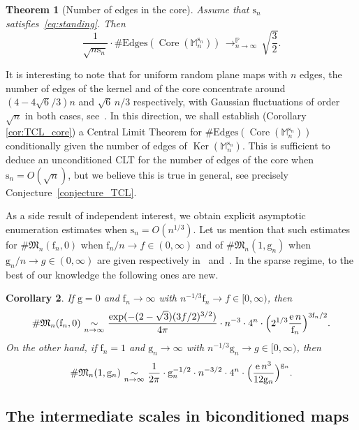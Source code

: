 \documentclass[JEP,XML,SOM,Unicode,NoFloatCountersInSection,NoEqCountersInSection]{cedram}
\theoremstyle{plain}
\newtheorem{theorem}{Theorem}
\newtheorem{corollary}[theorem]{Corollary}
\theoremstyle{definition}
\theoremstyle{remark}
\renewcommand{\P}{\mathbb{P}}
\newcommand{\e}{\operatorname{e}}
\newcommand{\Mapb}{\mathbb{M}}
\newcommand{\face}{\mathrm{f}}
\newcommand{\gen}{\mathrm{g}}
\newcommand{\spar}{\mathrm{s}}
\DeclareMathOperator{\Core}{Core}
\DeclareMathOperator{\Ker}{Ker}
\newcommand{\cvproba}[1][n]{\,\mathop{\longrightarrow}^{\P}_{#1 \to \infty}\,}
\newcommand{\equi}[1][n]{\,\mathop{\sim}^{}_{#1 \to \infty}\,}
\begin{document}
\begin{theorem}[Number of edges in the core]
\label{thm:aretes_core}
Assume that $\spar_n$ satisfies~\eqref{eq:standing}.
Then
\[
\frac{1}{\sqrt{n\spar_n}} \cdot \#\mathrm{Edges}(\Core(\Mapb_n^{\spar_{n}})) \cvproba \sqrt{\frac{3}{2}}.
\]
\end{theorem}

It is interesting to note that for uniform random plane maps with $n$ edges, the number of edges of the kernel and of the core concentrate around $(4-4 \sqrt{6}/3)n$ and $\sqrt{6}\,n/3$ respectively, with Gaussian fluctuations of order $\sqrt{n}$ in both cases, see~\cite[Th.\,5]{NR18}. In this direction, we shall establish (Corollary \ref{cor:TCL_core}) a Central Limit Theorem for $\#\mathrm{Edges}(\Core(\Mapb_n^{\spar_{n}}))$ conditionally given the number of edges of $\Ker(\Mapb_n^{\spar_{n}})$.
This is sufficient to deduce an unconditioned CLT for the number of edges of the core when $\spar_n = O(\sqrt{n})$, but we believe this is true in general, see precisely Conjecture~\ref{conjecture_TCL}.

As a side result of independent interest, we obtain explicit asymptotic enumeration estimates when $\spar_n= O(n^{1/3})$. Let us mention that such estimates for $\# \mathfrak{M}_{n}(\face_{n},0)$ when $\face_{n}/n \rightarrow f \in (0,\infty)$ and of $\# \mathfrak{M}_{n}(1,\gen_{n})$ when $\gen_{n}/n \rightarrow g \in (0,\infty)$ are given respectively in~\cite[Th.\,1]{BCR93} and~\cite[Th.\,3]{ACCR13}. In the sparse regime, to the best of our knowledge the following ones are new.

\begin{corollary}
\label{cor:enumeration}
If $\gen=0$ and $\face_n \to \infty$ with $n^{-1/3} \face_n \to f \in [0,\infty)$, then
\[
\# \mathfrak{M}_n(\face_n,0)
\equi \frac{\exp(-(2-\sqrt{3}) (3f/2)^{3/2})}{4 \pi} \cdot n^{-3} \cdot 4^{n} \cdot \Bigl(2^{1/3} \frac{\e n}{\face_{n}}\Bigr)^{3\face_{n}/2}.
\]
On the other hand, if $\face_n=1$ and $\gen_n \to \infty$ with $n^{-1/3} \gen_n \to g \in [0,\infty)$, then
\[
\# \mathfrak{M}_n(1,\gen_n)
\equi \frac{1}{2\pi } \cdot \gen_n^{-1/2} \cdot n^{-3/2} \cdot 4^{n} \cdot \Bigl(\frac{\e n^3}{12 \gen_n}\Bigr)^{\gen_n}.
\]
\end{corollary}

\subsection{The intermediate scales in biconditioned maps}
\end{document}
